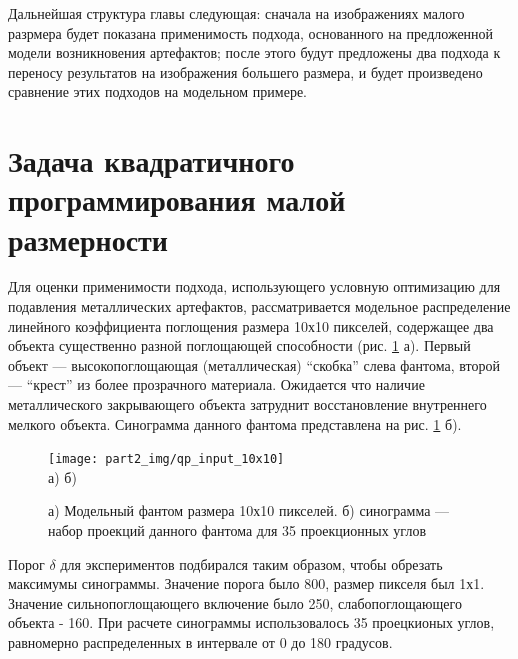 Дальнейшая структура главы следующая: сначала на изображениях малого разрмера будет показана применимость подхода, основанного на предложенной модели возникновения артефактов; после этого будут предложены два подхода к переносу результатов на изображения большего размера, и будет произведено сравнение этих подходов на модельном примере.

\section{Задача квадратичного программирования малой размерности}
\label{sect_2_1}

Для оценки применимости подхода, использующего условную оптимизацию для подавления металлических артефактов, рассматривается модельное распределение линейного коэффициента поглощения размера 10х10 пикселей, содержащее два объекта существенно разной поглощающей способности (рис. \ref{fig:qp_phantom_10by10} а).
Первый объект --- высокопоглощающая (металлическая) ``скобка'' слева фантома, второй --- ``крест'' из более прозрачного материала.
Ожидается что наличие металлического закрывающего объекта затруднит восстановление внутреннего мелкого объекта.
Синограмма данного фантома представлена на рис. \ref{fig:qp_phantom_10by10} б).



\begin{figure}
    \centering
    \texttt{[image: part2\_img/qp\_input\_10x10]} \\
    а) \hspace{0.5\textwidth} б)
    \caption{а) Модельный фантом размера 10х10 пикселей. б) синограмма --- набор проекций данного фантома для 35 проекционных углов}
    \label{fig:qp_phantom_10by10}
\end{figure}

Порог $\delta$ для экспериментов подбирался таким образом, чтобы обрезать максимумы синограммы.
Значение порога было 800, размер пикселя был 1х1.
Значение сильнопоглощающего включение было 250, слабопоглощающего объекта - 160.
При расчете синограммы использовалось 35 проецкионых углов, равномерно распределенных в интервале от 0 до 180 градусов.

